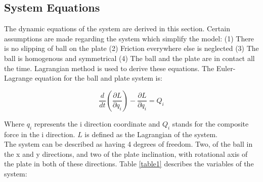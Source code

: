 \documentclass[conference]{IEEEtran}
\begin{document}
\subsection{System Equations}
The dynamic equations of the system are derived in this section. Certain assumptions are made regarding the system which simplify the model: (1) There is no slipping of ball on the plate (2) Friction everywhere else is neglected (3) The ball is homogenous and symmetrical (4) The ball and the plate are in contact all the time. Lagrangian method is used to derive these equations. The Euler-Lagrange equation for the ball and plate system is: 

\begin{equation}
\frac{d}{dt}\left(\frac{\partial L}{\partial q_{i}}\right) - \frac{\partial L}{\partial q_{i}} = Q_{i}\label{eq1}
\end{equation}

Where $q_{i}$ represents the i direction coordinate and $Q_{i}$ stands for the composite force in the i direction. $L$ is defined as the Lagrangian of the system.
\\The system can be described as having 4 degrees of freedom. Two, of the ball in the x and y directions, and two of the plate inclination, with rotational axis of the plate in both of these directions. Table \ref{table1} describes the variables of the system:
\end{document}
